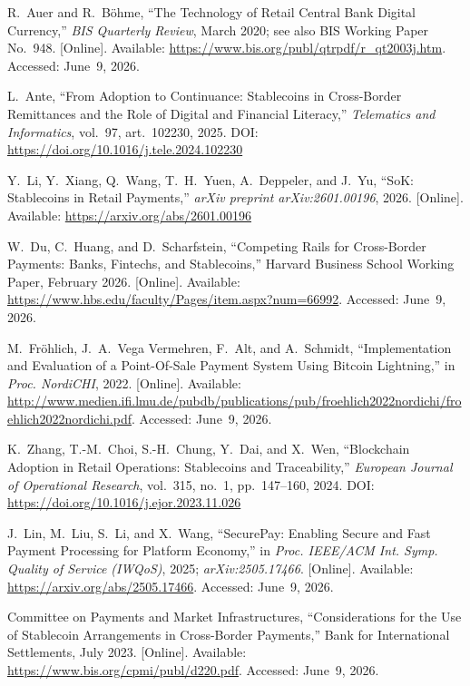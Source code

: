\documentclass[12pt, a4paper]{report}
\begin{document}
{\begin{enumerate}[label={[\arabic*]}]
\item R.~Auer and R.~B\"{o}hme, ``The Technology of Retail Central Bank Digital Currency,'' \textit{BIS Quarterly Review}, March 2020; see also BIS Working Paper No.~948. [Online]. Available: \url{https://www.bis.org/publ/qtrpdf/r_qt2003j.htm}. Accessed: June~9, 2026.

\item L.~Ante, ``From Adoption to Continuance: Stablecoins in Cross-Border Remittances and the Role of Digital and Financial Literacy,'' \textit{Telematics and Informatics}, vol.~97, art.~102230, 2025. DOI: \url{https://doi.org/10.1016/j.tele.2024.102230}

\item Y.~Li, Y.~Xiang, Q.~Wang, T.~H.~Yuen, A.~Deppeler, and J.~Yu, ``SoK: Stablecoins in Retail Payments,'' \textit{arXiv preprint arXiv:2601.00196}, 2026. [Online]. Available: \url{https://arxiv.org/abs/2601.00196}

\item W.~Du, C.~Huang, and D.~Scharfstein, ``Competing Rails for Cross-Border Payments: Banks, Fintechs, and Stablecoins,'' Harvard Business School Working Paper, February 2026. [Online]. Available: \url{https://www.hbs.edu/faculty/Pages/item.aspx?num=66992}. Accessed: June~9, 2026.

\item M.~Fr\"{o}hlich, J.~A.~Vega Vermehren, F.~Alt, and A.~Schmidt, ``Implementation and Evaluation of a Point-Of-Sale Payment System Using Bitcoin Lightning,'' in \textit{Proc. NordiCHI}, 2022. [Online]. Available: \url{http://www.medien.ifi.lmu.de/pubdb/publications/pub/froehlich2022nordichi/froehlich2022nordichi.pdf}. Accessed: June~9, 2026.

\item K.~Zhang, T.-M.~Choi, S.-H.~Chung, Y.~Dai, and X.~Wen, ``Blockchain Adoption in Retail Operations: Stablecoins and Traceability,'' \textit{European Journal of Operational Research}, vol.~315, no.~1, pp.~147--160, 2024. DOI: \url{https://doi.org/10.1016/j.ejor.2023.11.026}

\item J.~Lin, M.~Liu, S.~Li, and X.~Wang, ``SecurePay: Enabling Secure and Fast Payment Processing for Platform Economy,'' in \textit{Proc. IEEE/ACM Int. Symp. Quality of Service (IWQoS)}, 2025; \textit{arXiv:2505.17466}. [Online]. Available: \url{https://arxiv.org/abs/2505.17466}. Accessed: June~9, 2026.

\item Committee on Payments and Market Infrastructures, ``Considerations for the Use of Stablecoin Arrangements in Cross-Border Payments,'' Bank for International Settlements, July 2023. [Online]. Available: \url{https://www.bis.org/cpmi/publ/d220.pdf}. Accessed: June~9, 2026.


\end{enumerate}}
\end{document}

